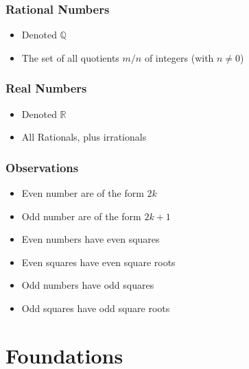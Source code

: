 \documentclass{report}
\begin{document}
  \section{Rational Numbers}%
    \begin{itemize}
      \item Denoted $\mathbb{Q}$
      \item The set of all quotients $m/n$ of integers (with $n \neq 0$)
    \end{itemize}


  \section{Real Numbers}%
    \begin{itemize}
      \item Denoted $\mathbb{R}$
      \item All Rationals, plus irrationals
    \end{itemize}

  \section{Observations}%
    \begin{itemize}
      \item Even number are of the form $2k$
      \item Odd number are of the form $2k + 1$
      \item Even numbers have even squares
      \item Even squares have even square roots
      \item Odd numbers have odd squares
      \item Odd squares have odd square roots
    \end{itemize}


\part{Foundations}%
\end{document}

